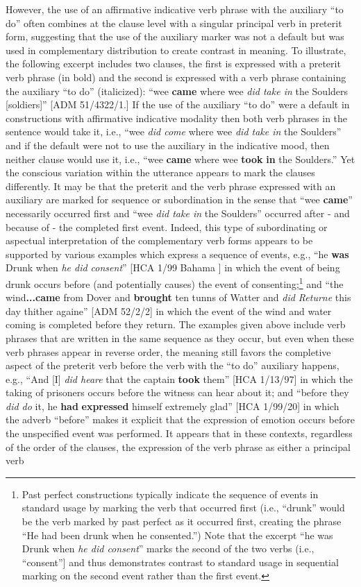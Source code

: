 However, the use of an affirmative indicative verb phrase with the auxiliary “to do” often combines at the clause level with a singular principal verb in preterit form, suggesting that the use of the auxiliary marker was not a default but was used in complementary distribution to create contrast in meaning. To illustrate, the following excerpt includes two clauses, the first is expressed with a preterit verb phrase (in bold) and the second is expressed with a verb phrase containing the auxiliary “to do” (italicized): “wee \textbf{came} where wee \textit{did take in} the Soulders [soldiers]” [ADM 51/4322/1.] If the use of the auxiliary “to do” were a default in constructions with affirmative indicative modality then both verb phrases in the sentence would take it, i.e., “wee \textit{did come} where wee \textit{did take in} the Soulders” and if the default were not to use the auxiliary in the indicative mood, then neither clause would use it, i.e., “wee \textbf{came} where wee \textbf{took} \textbf{in} the Soulders.” Yet the conscious variation within the utterance appears to mark the clauses differently. It may be that the preterit and the verb phrase expressed with an auxiliary are marked for sequence or subordination in the sense that “wee \textbf{came}” necessarily occurred first and “wee \textit{did take in} the Soulders” occurred after - and because of - the completed first event. Indeed, this type of subordinating or aspectual interpretation of the complementary verb forms appears to be supported by various examples which express a sequence of events, e.g., “he \textbf{was} Drunk when \textit{he did consent}” [HCA 1/99 Bahama \citealt{Islands1722}] in which the event of being drunk occurs before (and potentially causes) the event of consenting;\footnote{Past perfect constructions typically indicate the sequence of events in standard usage by marking the verb that occurred first (i.e., “drunk” would be the verb marked by past perfect as it occurred first, creating the phrase “He had been drunk when he consented.”) Note that the excerpt “he was Drunk when \textit{he did consent}” marks the second of the two verbs (i.e., “consent”] and thus demonstrates contrast to standard usage in sequential marking on the second event rather than the first event.}  and “the wind\textbf{...came} from Dover and \textbf{brought} ten tunns of Watter and \textit{did Returne} this day thither againe” [ADM 52/2/2] in which the event of the wind and water coming is completed before they return. The examples given above include verb phrases that are written in the same sequence as they occur, but even when these verb phrases appear in reverse order, the meaning still favors the completive aspect of the preterit verb before the verb with the “to do” auxiliary happens, e.g., “And [I] \textit{did heare} that the captain \textbf{took} them” [HCA 1/13/97] in which the taking of prisoners occurs before the witness can hear about it; and “before they \textit{did do} it, he \textbf{had} \textbf{expressed} himself extremely glad” [HCA 1/99/20] in which the adverb “before” makes it explicit that the expression of emotion occurs before the unspecified event was performed. It appears that in these contexts, regardless of the order of the clauses, the expression of the verb phrase as either a principal verb 